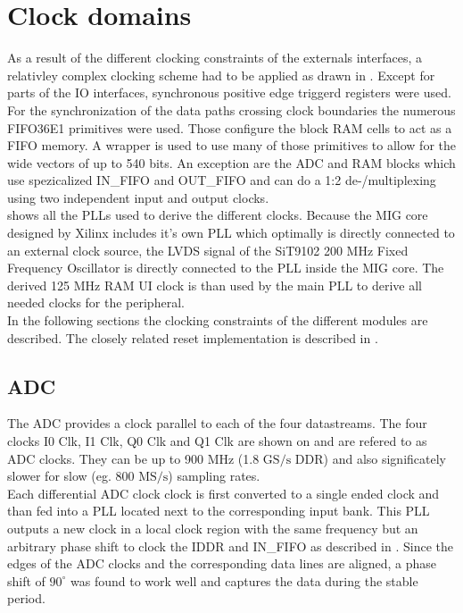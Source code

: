 \section{Clock domains}
\label{sec:fpga_clocks}

As a result of the different clocking constraints of the externals interfaces,
a relativley complex clocking scheme had to be applied as drawn in
. Except for parts of the \acrshort{IO} interfaces,
synchronous positive edge triggerd registers were used. For the synchronization
of the data paths crossing clock boundaries the numerous FIFO36E1 primitives
were used. Those configure the block \gls{RAM} cells to act as a \gls{FIFO}
memory. A wrapper is used to use many of those primitives to allow for the
wide vectors of up to 540 bits.
An exception are the \gls{ADC} and \gls{RAM} blocks which use
spezicalized IN\_FIFO and OUT\_FIFO and can do a 1:2 de-/multiplexing
using two independent input and output clocks. \\

 shows all the \glspl{PLL} used to derive the
different clocks. Because the \gls{MIG} core designed by Xilinx includes
it's own \gls{PLL} which optimally is directly connected to an external
clock source, the \gls{LVDS} signal of the SiT9102 200 MHz Fixed Frequency
Oscillator is directly connected to the \gls{PLL} inside the \gls{MIG} core.
The derived 125 MHz \gls{RAM} \gls{UI} clock is than used by the main
\gls{PLL} to derive all needed clocks for the peripheral. \\

In the following sections the clocking constraints of the different modules
are described. The closely related reset implementation is described
in . \\

\subsection{\gls{ADC}}
The \gls{ADC} provides a clock parallel to each of the four datastreams.
The four clocks I0 Clk, I1 Clk, Q0 Clk and Q1 Clk are shown on
 and are refered to as \gls{ADC} clocks.
They can be up to 900 MHz (1.8 $\text{GS}/\text{s}$ \gls{DDR})
and also significately slower for slow (eg. 800 $\text{MS}/\text{s}$)
sampling rates. \\

Each differential \gls{ADC} clock clock is first converted to a single ended
clock and than fed into a \gls{PLL} located next to the corresponding input
bank. This \gls{PLL} outputs a new clock in a local clock region
with the same frequency but an arbitrary phase shift
to clock the IDDR and IN\_FIFO as described in .
Since the edges of the \gls{ADC} clocks and the corresponding data lines
are aligned, a phase shift of $90^\circ$ was found to work well and captures
the data during the stable period. \\

